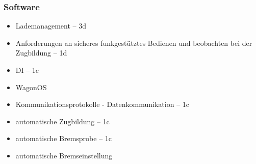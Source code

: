 \subsubsection{Software}
\begin{itemize}
    \item Lademanagement \label{sec:Lademanagment} -- 3d
    \item Anforderungen an sicheres funkgestütztes Bedienen und beobachten bei der Zugbildung -- 1d
    \item DI -- 1c
    \item \gls{WagonOS}
    \item Kommunikationsprotokolle - Datenkommunikation -- 1c
    \item automatische Zugbildung -- 1c
    \item automatische Bremsprobe -- 1c
    \item automatische Bremseinstellung
\end{itemize}
